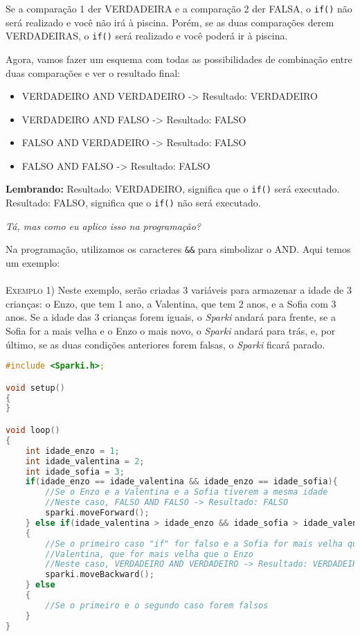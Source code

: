     Se a comparação 1 der VERDADEIRA e a comparação 2 der FALSA, o \lstinline[columns=fixed]{if()} não será realizado e você não irá à piscina. Porém, se as duas comparações derem VERDADEIRAS, o \lstinline[columns=fixed]{if()} será realizado e você poderá ir à piscina.
    
    Agora, vamos fazer um esquema com todas as possibilidades de combinação entre duas comparações e ver o resultado final:
    
    \begin{itemize}
        \item VERDADEIRO AND VERDADEIRO -> Resultado: VERDADEIRO
        \item VERDADEIRO AND FALSO -> Resultado: FALSO
        \item FALSO AND VERDADEIRO -> Resultado: FALSO
        \item FALSO AND FALSO -> Resultado: FALSO
    \end{itemize}
    
    \begin{center}
    \textcolor{mydarkblue!80!black}{\textbf{Lembrando:}}
    Resultado: VERDADEIRO, significa que o \lstinline[columns=fixed]{if()} será executado. 
    Resultado: FALSO, significa que o \lstinline[columns=fixed]{if()} não será executado.
    \end{center}
 
    \textit{Tá, mas como eu aplico isso na programação?}
        
    Na programação, utilizamos os caracteres \lstinline[columns=fixed]{&&} para simbolizar o AND. 
    Aqui temos um exemplo:
    \\~\\
    \textsc{Exemplo 1)} Neste exemplo, serão criadas 3 variáveis para armazenar a idade de 3 crianças: o Enzo, que tem 1 ano, a Valentina, que tem 2 anos, e a Sofia com 3 anos. Se a idade das 3 crianças forem iguais, o \textsl{Sparki} andará para frente, se a Sofia for a mais velha e o Enzo o mais novo, o \textsl{Sparki} andará para trás, e, por último, se as duas condições anteriores forem falsas, o \textsl{Sparki} ficará parado.

    \begin{lstlisting}[language=C]
#include <Sparki.h>;

void setup()
{
}

void loop()
{
    int idade_enzo = 1;
    int idade_valentina = 2;
    int idade_sofia = 3;
    if(idade_enzo == idade_valentina && idade_enzo == idade_sofia){
        //Se o Enzo e a Valentina e a Sofia tiverem a mesma idade
        //Neste caso, FALSO AND FALSO -> Resultado: FALSO
        sparki.moveForward();
    } else if(idade_valentina > idade_enzo && idade_sofia > idade_valentina) 
    {
        //Se o primeiro caso "if" for falso e a Sofia for mais velha que a 
        //Valentina, que for mais velha que o Enzo
        //Neste caso, VERDADEIRO AND VERDADEIRO -> Resultado: VERDADEIRO
        sparki.moveBackward();
    } else 
    {
        //Se o primeiro e o segundo caso forem falsos
    }
}
\end{lstlisting}

